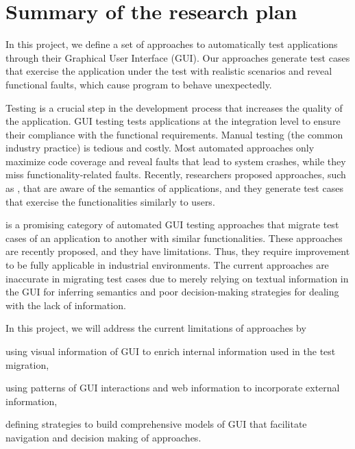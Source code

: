 	\section{Summary of the research plan}


In this project, we define a set of approaches to automatically test applications through their Graphical User Interface (GUI). 
Our approaches generate test cases that exercise the application under the test with realistic scenarios and reveal functional faults, which cause program to behave unexpectedly. 


Testing is a crucial step in the development process that increases the quality of the application.
GUI testing tests applications at the integration level to ensure their compliance with the functional requirements. 
Manual testing (the common industry practice) is tedious and costly. 
Most automated approaches only maximize code coverage and reveal faults that lead to system crashes, while they miss functionality-related faults. 
Recently, researchers proposed approaches, such as \testreuse, that are aware of the semantics of applications, and they generate test cases that exercise the functionalities similarly to users. 


\testreuse is a promising category of automated GUI testing approaches that migrate test cases of an application to another with similar functionalities. These approaches are recently proposed, and they have limitations. 
Thus, they require improvement to be fully applicable in industrial environments. The current \testreuse approaches are inaccurate in migrating test cases due to merely relying on textual information in the GUI for inferring semantics and poor decision-making strategies for dealing with the lack of information. 


In this project, we will address the current limitations of \testreuse approaches by
\begin{inparaenum}[(i)]
\item using visual information of GUI to enrich internal information used in the test migration,
\item using patterns of GUI interactions and web information to incorporate external information,
\item defining strategies to build comprehensive models of GUI that facilitate navigation and decision making of \testreuse approaches.
\end{inparaenum}

